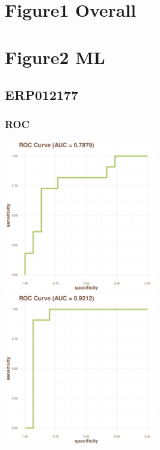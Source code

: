 \documentclass[
]{article}
\author{YNYK}
\date{2023-09-28}
\begin{document}
\hypertarget{figure1-overall}{%
\section{Figure1 Overall}\label{figure1-overall}}

\hypertarget{figure2-ml}{%
\section{Figure2 ML}\label{figure2-ml}}

\hypertarget{erp012177}{%
\subsection{ERP012177}\label{erp012177}}

\hypertarget{roc}{%
\subsubsection{ROC}\label{roc}}

\includegraphics[width=0.5\textwidth,height=0.5\textheight]{../../Analysis_shotgun_ERP012177/03_ML/shotgun/atlas_binning/ERP012177_binning_best.model_draw_Roc_plot.pdf}
\includegraphics[width=0.5\textwidth,height=0.5\textheight]{../../Analysis_shotgun_ERP012177/03_ML/shotgun/krakens/ERP012177_best.model_draw_Roc_plot.pdf}
\end{document}
